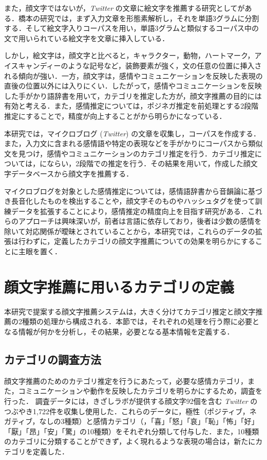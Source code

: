 \documentclass[japanese]{jnlp_1.4}
\begin{document}
また，顔文字ではないが，{\it Twitter} の文章に絵文字を推薦する研究としてがある．橋本の研究では，まず入力文章を形態素解析し，それを単語3グラムに分割する．そして絵文字入りコーパスを用い，単語3グラムと類似するコーパス中の文で用いられている絵文字を文章に挿入している．

しかし，絵文字は，顔文字と比べると，キャラクター，動物，ハートマーク，アイスキャンディーのような記号など，装飾要素が強く，文の任意の位置に挿入される傾向が強い．一方，顔文字は，感情やコミュニケーションを反映した表現の直後の位置以外には入りにくい．したがって，感情やコミュニケーションを反映した手がかり語辞書を用いて，カテゴリを推定した方が，顔文字推薦の目的には有効と考える．また，感情推定については，ポジネガ推定を前処理とする2段階推定にすることで，精度が向上することがから明らかになっている．

本研究では，マイクロブログ ({\it Twitter}) の文章を収集し，コーパスを作成する．また，入力文に含まれる感情語や特定の表現などを手がかりにコーパスから類似文を見つけ，感情やコミュニケーションのカテゴリ推定を行う．カテゴリ推定については，にならい，2段階での推定を行う．その結果を用いて，作成した顔文字データベースから顔文字を推薦する．

マイクロブログを対象とした感情推定については，感情語辞書から音韻論に基づき長音化したものを検出すること\cite{brody2011}や，顔文字そのものやハッシュタグを使って訓練データを拡張すること\cite{purver2012}により，感情推定の精度向上を目指す研究がある．これらのアプローチは興味深いが，前者は言語に依存しており，後者は少数の感情を除いて対応関係が曖昧とされていることから，本研究では，これらのデータの拡張は行わずに，定義したカテゴリの顔文字推薦についての効果を明らかにすることに主眼を置く．



\section{顔文字推薦に用いるカテゴリの定義}
\label{sec:category}

本研究で提案する顔文字推薦システムは，大きく分けてカテゴリ推定と顔文字推薦の2種類の処理から構成される．本節では，それぞれの処理を行う際に必要となる情報が何かを分析し，その結果，必要となる基本情報を定義する．


\subsection{カテゴリの調査方法}

顔文字推薦のためのカテゴリ推定を行うにあたって，必要な感情カテゴリ，また，コミュニケーションや動作を反映したカテゴリを明らかにするため，調査を行った．
調査データには，きざしラボ\cite{kizashi}が提供する顔文字92個を含む {\it Twitter} のつぶやき1,722件を収集し使用した．これらのデータに，極性（ポジティブ，ネガティブ，なしの3種類）と感情カテゴリ（，「喜」「怒」「哀」「恥」「怖」「好」「厭」「昂」「安」「驚」の10種類）をそれぞれ分類して付与した．また，10種類のカテゴリに分類することができず，よく現れるような表現の場合は，新たにカテゴリを定義した．
\end{document}
